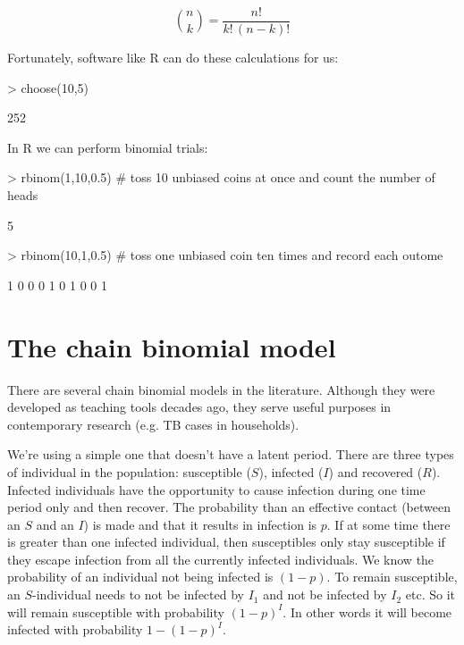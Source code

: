 \documentclass{article}
\begin{document}
\begin{equation}
{n \choose k}=\frac{n!}{k!\,(n-k)!}
\end{equation}

Fortunately, software like R can do these calculations for us:
\begin{Schunk}
\begin{Sinput}
> choose(10,5)
\end{Sinput}
\begin{Soutput}
[1] 252
\end{Soutput}
\end{Schunk}
In R we can perform binomial trials:

\begin{Schunk}
\begin{Sinput}
> rbinom(1,10,0.5) # toss 10 unbiased coins at once and count the number of heads
\end{Sinput}
\begin{Soutput}
[1] 5
\end{Soutput}
\begin{Sinput}
> rbinom(10,1,0.5) # toss one unbiased coin ten times and record each outome
\end{Sinput}
\begin{Soutput}
 [1] 1 0 0 0 1 0 1 0 0 1
\end{Soutput}
\end{Schunk}


\section*{The chain binomial model}

There are several chain binomial models in the literature. Although they were developed as teaching tools decades ago, they serve useful purposes in contemporary research (e.g. TB cases in households). 

We're using a simple one that doesn't have a latent period. There are three types of individual in the population: susceptible ($S$), infected ($I$) and recovered ($R$). Infected individuals have the opportunity to cause infection during one time period only and then recover. The probability than an effective contact (between an $S$ and an $I$) is made and that it results in infection is $p$. If at some time there is greater than one infected individual, then susceptibles only stay susceptible if they escape infection from all the currently infected individuals. We know the probability of an individual not being infected is $(1-p)$. To remain susceptible, an $S$-individual needs to not be infected by $I_1$ and not be infected by $I_2$ etc. So it will remain susceptible with probability $(1-p)^I$. In other words it will become infected with probability $1-(1-p)^I$. 
\end{document}
